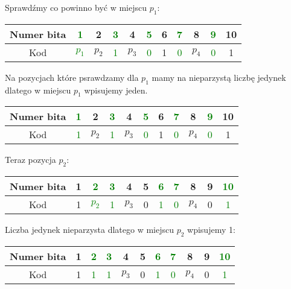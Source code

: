 \documentclass{article}
\begin{document}
Sprawdźmy co powinno być w miejscu $p_1$:
\begin{center}
        \begin{tabular}{|c|c|c|c|c|c|c|c|c|c|c|}
        \hline
        Numer bita & \textcolor{green}{1} & 2 & \textcolor{green}{3} & 4 & \textcolor{green}{5} & 6 & \textcolor{green}{7} & 8 & \textcolor{green}{9} & 10 \\
        \hline
        Kod & \textcolor{green}{$p_1$} & $p_2$ & \textcolor{green}{1} & $p_3$ & \textcolor{green}{0} & 1 & \textcolor{green}{0} & $p_4$ & \textcolor{green}{0} & 1 \\
        \hline
    \end{tabular}
\end{center}
Na pozycjach które psrawdzamy dla $p_1$ mamy na nieparzystą liczbę jedynek dlatego w miejscu 
$p_1$ wpisujemy jeden.
\begin{center}
        \begin{tabular}{|c|c|c|c|c|c|c|c|c|c|c|}
        \hline
        Numer bita & \textcolor{green}{1} & 2 & \textcolor{green}{3} & 4 & \textcolor{green}{5} & 6 & \textcolor{green}{7} & 8 & \textcolor{green}{9} & 10 \\
        \hline
        Kod & \textcolor{green}{1} & $p_2$ & \textcolor{green}{1} & $p_3$ & \textcolor{green}{0} & 1 & \textcolor{green}{0} & $p_4$ & \textcolor{green}{0} & 1 \\
        \hline
    \end{tabular}
\end{center}
Teraz pozycja $p_2$:
\begin{center}
        \begin{tabular}{|c|c|c|c|c|c|c|c|c|c|c|}
        \hline
        Numer bita & 1 & \textcolor{green}{2} & \textcolor{green}{3} & 4 & 5 & \textcolor{green}{6} & \textcolor{green}{7} & 8 & 9 & \textcolor{green}{10} \\
        \hline
        Kod & 1 & \textcolor{green}{$p_2$} & \textcolor{green}{1} & $p_3$ & 0 & \textcolor{green}{1} & \textcolor{green}{0} & $p_4$ & 0 & \textcolor{green}{1} \\
        \hline
    \end{tabular}
\end{center}
Liczba jedynek nieparzysta dlatego w miejscu $p_2$ wpisujemy 1:
\begin{center}
        \begin{tabular}{|c|c|c|c|c|c|c|c|c|c|c|}
        \hline
        Numer bita & 1 & \textcolor{green}{2} & \textcolor{green}{3} & 4 & 5 & \textcolor{green}{6} & \textcolor{green}{7} & 8 & 9 & \textcolor{green}{10} \\
        \hline
        Kod & 1 & \textcolor{green}{1} & \textcolor{green}{1} & $p_3$ & 0 & \textcolor{green}{1} & \textcolor{green}{0} & $p_4$ & 0 & \textcolor{green}{1} \\
        \hline
    \end{tabular}
\end{center}
\end{document}
